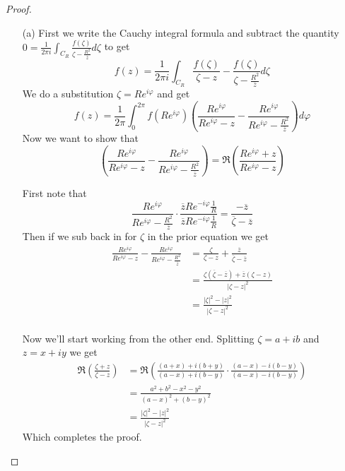 \documentclass[10pt]{article}
\newcommand{\conj}[1]{\overline{#1}}
\theoremstyle{plain}
\theoremstyle{remark}
\begin{document}
\begin{proof}
  \begin{itemize}
  \item[(a)] First we write the Cauchy integral formula and subtract the quantity
    $0=\frac{1}{2\pi i}\int_{C_R}\frac{f(\zeta)}{\zeta-\frac{R^2}{\conj{z}}}d\zeta$ to get
    \[
      f(z)=\frac{1}{2\pi i}\int_{C_R}\frac{f(\zeta)}{\zeta-z}-\frac{f(\zeta)}{\zeta-\frac{R^2}{\conj{z}}}d\zeta
    \]
    We do a substitution $\zeta=Re^{i\varphi}$ and get
    \[
      f(z)=\frac{1}{2\pi}\int_0^{2\pi}f(Re^{i\varphi})\left(\frac{Re^{i\varphi}}{Re^{i\varphi}-z}-\frac{Re^{i\varphi}}{Re^{i\varphi}-\frac{R^2}{\conj{z}}}\right)d\varphi
    \]
    Now we want to show that
    \[
      \left(
        \frac{Re^{i\varphi}}{Re^{i\varphi}-z}-\frac{Re^{i\varphi}}{Re^{i\varphi}-\frac{R^2}{\conj{z}}}
      \right)
      =
      \Re
      \left(
        \frac{Re^{i\varphi}+z}{Re^{i\varphi}-z}
      \right)
    \]

    First note that
    \[
      \frac{Re^{i\varphi}}{Re^{i\varphi}-\frac{R^2}{\conj{z}}}\cdot\frac{\conj{z}Re^{-i\varphi}\frac{1}{R}}{\conj{z}Re^{-i\varphi}\frac{1}{R}} = \frac{-\conj{z}}{\conj{\zeta}-\conj{z}}
    \]
    Then if we sub back in for $\zeta$ in the prior equation we get
    \begin{align*}
      \frac{Re^{i\varphi}}{Re^{i\varphi}-z}-\frac{Re^{i\varphi}}{Re^{i\varphi}-\frac{R^2}{\conj{z}}} &= \frac{\zeta}{\zeta-z}+\frac{\conj{z}}{\conj{\zeta}-\conj{z}}\\
                                                                            &= \frac{\zeta(\conj{\zeta}-\conj{z})+\conj{z}(\zeta-z)}{|\zeta-z|^2}\\
                                                                            &= \frac{|\zeta|^2-|z|^2}{|\zeta-z|^2}\\
    \end{align*}

    Now we'll start working from the other end. Splitting $\zeta=a+ib$ and $z=x+iy$ we get
    \begin{align*}
      \Re\left(\frac{\zeta+z}{\zeta-z}\right) &= \Re\left(\frac{(a+x)+i(b+y)}{(a-x)+i(b-y)}\cdot\frac{(a-x)-i(b-y)}{(a-x)-i(b-y)}\right)\\
                                    &= \frac{a^2+b^2-x^2-y^2}{(a-x)^2+(b-y)^2}\\
                                    &=\frac{|\zeta|^2-|z|^2}{|\zeta-z|^2}
    \end{align*}
    Which completes the proof.
    

\end{itemize}
\end{proof}
\end{document}
